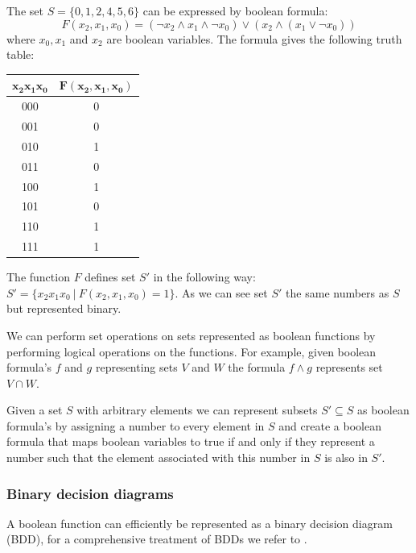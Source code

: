 \begin{example}
	\label{ex_boolform}
	The set $S = \{0,1,2,4,5,6 \}$ can be expressed by boolean formula:
	\[ F(x_2,x_1,x_0) = (\neg x_2 \wedge x_1 \wedge \neg x_0) \vee (x_2 \wedge (x_1 \vee \neg x_0)) \]
	where $x_0,x_1$ and $x_2$ are boolean variables. The formula gives the following truth table:\\
	\begin{center}
		\begin{tabular}{|c|c|}
			\hline 
			$\mathbf{x_2x_1x_0}$ & $\mathbf{F(x_2,x_1,x_0)}$ \\ 
			\hline 
			000 & 0 \\ 
			\hline 
			001 & 0 \\ 
			\hline 
			010 & 1 \\ 
			\hline 
			011 & 0 \\ 
			\hline 
			100 & 1 \\ 
			\hline 
			101 & 0 \\ 
			\hline 
			110 & 1 \\ 
			\hline 
			111 & 1 \\ 
			\hline
		\end{tabular} 
	\end{center}
	The function $F$ defines set $S'$ in the following way: $S' = \{x_2x_1x_0\ |\ F(x_2,x_1,x_0) = 1 \}$. As we can see set $S'$ the same numbers as $S$ but represented binary.
\end{example}
We can perform set operations on sets represented as boolean functions by performing logical operations on the functions. For example, given boolean formula's $f$ and $g$ representing sets $V$ and $W$ the formula $f \wedge g$ represents set $V \cap W$.

Given a set $S$ with arbitrary elements we can represent subsets $S' \subseteq S$ as boolean formula's by assigning a number to every element in $S$ and create a boolean formula that maps boolean variables to true if and only if they represent a number such that the element associated with this number in $S$ is also in $S'$.

\subsubsection{Binary decision diagrams}
A boolean function can efficiently be represented as a binary decision diagram (BDD), for a comprehensive treatment of BDDs we refer to \cite{BDD_book,Handbook_BDD_Chapter}.

